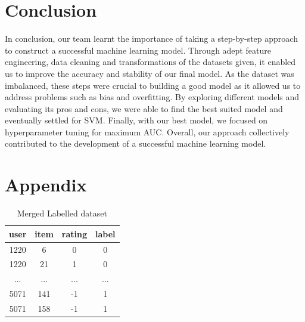 \documentclass[12pt]{article}
\begin{document}
\section{Conclusion}
In conclusion, our team learnt the importance of taking a step-by-step approach to construct a successful machine learning model. Through adept feature engineering, data cleaning and transformations of the datasets given, it enabled us to improve the accuracy and stability of our final model. As the dataset was imbalanced, these steps were crucial to building a good model as it allowed us to address problems such as bias and overfitting. By exploring different models and evaluating its pros and cons, we were able to find the best suited model and eventually settled for SVM. Finally, with our best model, we focused on hyperparameter tuning for maximum AUC. Overall, our approach collectively contributed to the development of a successful machine learning model.
\pagebreak
\section{Appendix}
\begin{table}[ht!]
  \centering
  \bgroup
  \def\arraystretch{1.5}%
  \begin{tabular}{|c|c c c|}
    \hline
    {user} & item & rating & label \\
    \hline
    1220   & 6    & 0      & 0     \\
    1220   & 21   & 1      & 0     \\
    ...    & ...  & ...    & ...   \\
    5071   & 141  & -1     & 1     \\
    5071   & 158  & -1     & 1     \\
    \hline
  \end{tabular}
  \egroup
  \caption{Merged Labelled dataset}
  \label{table:1}
\end{table}
\end{document}

